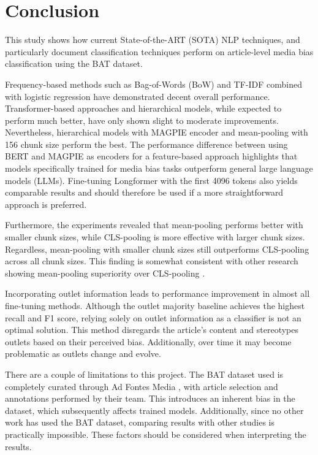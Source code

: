\chapter{Conclusion}
\label{cha:6}

This study shows how current State-of-the-ART (SOTA) NLP techniques, and particularly document classification techniques perform on article-level media bias classification using the BAT dataset.

Frequency-based methods such as Bag-of-Words (BoW) and TF-IDF combined with logistic regression have demonstrated decent overall performance. Transformer-based approaches and hierarchical models, while expected to perform much better, have only shown slight to moderate improvements. Nevertheless, hierarchical models with MAGPIE encoder and mean-pooling with 156 chunk size perform the best. The performance difference between using BERT and MAGPIE as encoders for a feature-based approach highlights that models specifically trained for media bias tasks outperform general large language models (LLMs). Fine-tuning Longformer with the first 4096 tokens also yields comparable results and should therefore be used if a more straightforward approach is preferred.

Furthermore, the experiments revealed that mean-pooling performs better with smaller chunk sizes, while CLS-pooling is more effective with larger chunk sizes. Regardless, mean-pooling with smaller chunk sizes still outperforms CLS-pooling across all chunk sizes. This finding is somewhat consistent with other research showing mean-pooling superiority over CLS-pooling \cite{rodrigo-2024-systematic-review-media-bias}.

Incorporating outlet information leads to performance improvement in almost all fine-tuning methods. Although the outlet majority baseline achieves the highest recall and F1 score, relying solely on outlet information as a classifier is not an optimal solution. This method disregards the article's content and stereotypes outlets based on their perceived bias. Additionally, over time it may become problematic as outlets change and evolve.

There are a couple of limitations to this project. The BAT dataset used is completely curated through Ad Fontes Media \cite{adfontes}, with article selection and annotations performed by their team. This introduces an inherent bias in the dataset, which subsequently affects trained models. Additionally, since no other work has used the BAT dataset, comparing results with other studies is practically impossible. These factors should be considered when interpreting the results.

